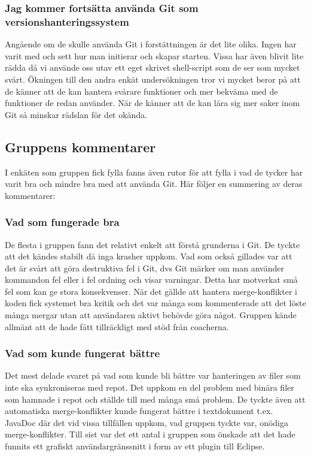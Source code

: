 \subsubsection{Jag kommer fortsätta använda Git som versionshanteringssystem}

Angående om de skulle använda Git i forstättningen är det lite olika. Ingen har varit med och sett hur man initierar och skapar starten. Vissa har även blivit lite rädda då vi använde oss utav ett eget skrivet shell-script som de ser som mycket svårt. Ökningen till den andra enkät undersökningen tror vi mycket beror på att de känner att de kan hantera svårare funktioner och mer bekväma med de funktioner de redan använder. När de känner att de kan lära sig mer saker inom Git så minskar rädslan för det okända. 

\subsection{Gruppens kommentarer}
I enkäten som gruppen fick fylla fanns även rutor för att fylla i vad de tycker har varit bra och mindre bra med att använda Git. Här följer en summering av deras kommentarer:

\subsubsection{Vad som fungerade bra}
De flesta i gruppen fann det relativt enkelt att förstå grunderna i Git. De tyckte att det kändes stabilt då inga krasher uppkom. Vad som också gillades var att det är svårt att göra destruktiva fel i Git, dvs Git märker om man använder kommandon fel eller i fel ordning och visar varningar. Detta har motverkat små fel som kan ge stora konsekvenser. När det gällde att hantera merge-konflikter i koden fick systemet bra kritik och det var många som kommenterade att det löste många mergar utan att användaren aktivt behövde göra något. Gruppen kände allmänt att de hade fått tillräckligt med stöd från coacherna.

\subsubsection{Vad som kunde fungerat bättre}
Det mest delade svaret på vad som kunde bli bättre var hanteringen av filer som inte ska synkroniseras med repot. Det uppkom en del problem med binära filer som hamnade i repot och ställde till med många små problem. De tyckte även att automatiska merge-konflikter kunde fungerat bättre i textdokument t.ex. JavaDoc där det vid vissa tillfällen uppkom, vad gruppen tyckte var, onödiga merge-konflikter. Till sist var det ett antal i gruppen som önskade att det hade funnits ett grafiskt användargränssnitt i form av ett plugin till Eclipse. 